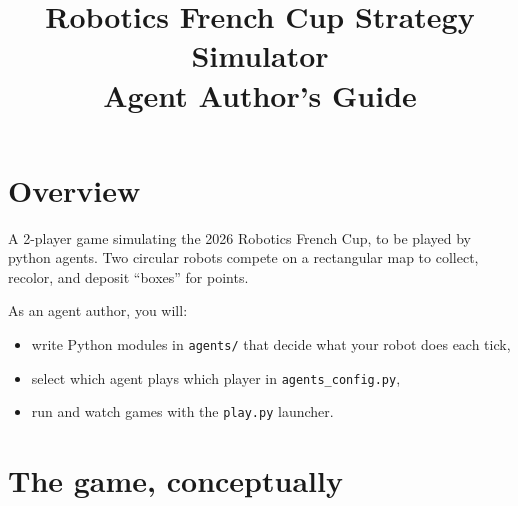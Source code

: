 \documentclass[11pt,a4paper]{article}
\title{\textbf{Robotics French Cup Strategy Simulator}\\[0.3em]\large Agent Author's Guide}
\author{}
\date{}
\newcommand{\code}[1]{\texttt{#1}}
\begin{document}
\maketitle
\thispagestyle{empty}

\tableofcontents
\newpage

\section{Overview}

A 2-player game simulating the 2026 Robotics French Cup, to be played by python agents.
Two circular robots compete on a rectangular map to collect, recolor, and
deposit ``boxes'' for points.

As an agent author, you will:
\begin{itemize}[nosep]
    \item write Python modules in \code{agents/} that decide what your robot
          does each tick,
    \item select which agent plays which player in \code{agents\_config.py},
    \item run and watch games with the \code{play.py} launcher.
\end{itemize}

\section{The game, conceptually}
\end{document}
